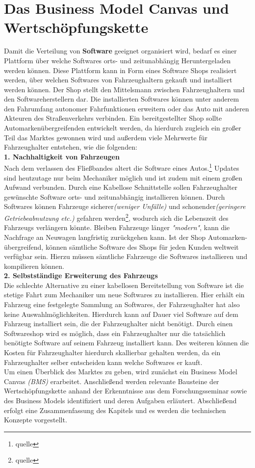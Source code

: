 \section{Das Business Model Canvas und Wertschöpfungskette}\label{markt}
Damit die Verteilung von \textbf{Software} geeignet organisiert wird, bedarf es einer Plattform über welche Softwares orts- und zeitunabhängig Heruntergeladen werden können. Diese Plattform kann in Form eines Software Shops realisiert werden, über welchen Softwares von Fahrzeughaltern gekauft und installiert werden können. Der Shop stellt den Mittelsmann zwischen Fahrzeughaltern und den Softwareherstellern dar. Die installierten Softwares können unter anderem den Fahrumfang autonomer Fahrfunktionen erweitern oder das Auto mit anderen Akteuren des Straßenverkehrs verbinden. Ein bereitgestellter Shop sollte Automarkenübergreifenden entwickelt werden, da hierdurch zugleich ein großer Teil das Marktes gewonnen wird und außerdem viele Mehrwerte für Fahrzeughalter entstehen, wie die folgenden:\\

\textbf{1. Nachhaltigkeit von Fahrzeugen}\\
Nach dem verlassen des Fließbandes altert die Software eines Autos.\footnote{quelle} Updates sind heutzutage nur beim Mechaniker möglich und ist zudem mit einem großen Aufwand verbunden. Durch eine Kabellose Schnittstelle sollen Fahrzeughalter gewünschte Software orts- und zeitunabhängig installieren können. Durch Softwares können Fahrzeuge sicherer\textit{(weniger Unfälle)} und schonender\textit{(geringere Getriebeabnutzung etc.)} gefahren werden\footnote{quelle}, wodurch sich die Lebenszeit des Fahrzeugs verlängern könnte. Bleiben Fahrzeuge länger \textit{"modern"}, kann die Nachfrage an Neuwagen langfristig zurückgehen kann. Ist der Shop Automarken-übergreifend, können sämtliche Software des Shops für jeden Kunden weltweit verfügbar sein. Hierzu müssen sämtliche Fahrzeuge die Softwares installieren und kompilieren können.\\


\textbf{2. Selbstständige Erweiterung des Fahrzeugs}\\
Die schlechte Alternative zu einer kabellosen Bereitstellung von Software ist die stetige Fahrt zum Mechaniker um neue Softwares zu installieren. Hier erhält ein Fahrzeug eine festgelegte Sammlung an Softwares, der Fahrzeughalter hat also keine Auswahlmöglichkeiten. Hierdurch kann auf Dauer viel Software auf dem Fahrzeug installiert sein, die der Fahrzeughalter nicht benötigt. Durch einen Softwareshop wird es möglich, dass ein Fahrzeughalter nur die tatsächlich benötigte Software auf seinem Fahrzeug installiert kann. Des weiteren können die Kosten für Fahrzeughalter hierdurch skallierbar gehalten werden, da ein Fahrzeughalter selber entscheiden kann welche Softwares er kauft.\\

Um einen Überblick des Marktes zu geben, wird zunächst ein Business Model Canvas \textit{(BMS)} erarbeitet. Anschließend werden relevante Bausteine der Wertschöpfungskette anhand der Erkenntnisse aus dem Forschungsseminar sowie des Business Models identifiziert und deren Aufgaben erläutert. Abschließend erfolgt eine Zusammenfassung des Kapitels und es werden die technischen Konzepte vorgestellt.